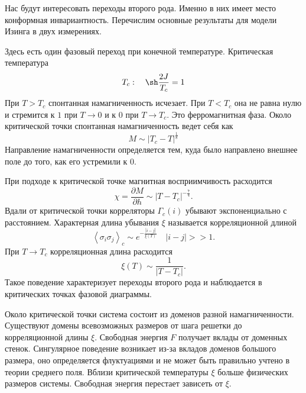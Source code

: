 \documentclass[a4paper,12pt]{article}
\theoremstyle{definition}
\theoremstyle{definition}
\theoremstyle{definition}
\begin{document}
Нас будут интересовать переходы второго рода. Именно в них имеет место конформная инвариантность. 
Перечислим основные результаты для модели Изинга в двух измерениях.

Здесь есть один фазовый переход при конечной температуре. 
Критическая температура
\begin{equation}
  \label{eq:27}
  T_c:\quad \sh \frac{2J}{T_c}=1
\end{equation}
При $T>T_c$ спонтанная намагниченность исчезает. При $T<T_c$ она не равна нулю и стремится к $1$ при $T\to 0$ и к $0$ при $T\to T_c$. Это ферромагнитная фаза. Около критической точки спонтанная намагниченность ведет себя как
\begin{equation}
  \label{eq:28}
  M\sim \left|T_c-T\right|^{\frac{1}{8}}
\end{equation}
Направление намагниченности определяется тем, куда было направлено внешнее поле до того, как его устремили к $0$. 

При подходе к критической точке магнитная восприимчивость расходится
\begin{equation}
  \label{eq:29}
  \chi=\frac{\partial M}{\partial h}\sim \left|T-T_c \right|^{-\frac{7}{4}}.
\end{equation}
Вдали от критической точки корреляторы $\Gamma_c(i)$ убывают экспоненциально с расстоянием. Характерная длина убывания $\xi$ называется корреляционной длиной
\begin{equation}
  \label{eq:30}
  \left<\sigma_i\sigma_j\right>_c\sim e^{-\frac{\left|i-j\right|}{\xi(T)}}\quad \left|i-j\right|>>1.
\end{equation}
При $T\to T_c$ корреляционная длина расходится
\begin{equation}
  \label{eq:31}
  \xi(T)\sim \frac{1}{\left|T-T_c\right|}.
\end{equation}
Такое поведение характеризует переходы второго рода и наблюдается в критических точках фазовой диаграммы.

Около критической точки система состоит из доменов разной намагниченности. Существуют домены всевозможных размеров от шага решетки до корреляционной длины $\xi$. Свободная энергия $F$ получает вклады от доменных стенок. Сингулярное поведение возникает из-за вкладов доменов большого размера, оно определяется флуктуациями и не может быть правильно учтено в теории среднего поля. Вблизи критической температуры $\xi$ больше физических размеров системы. Свободная энергия перестает зависеть от $\xi$. 
\end{document}
